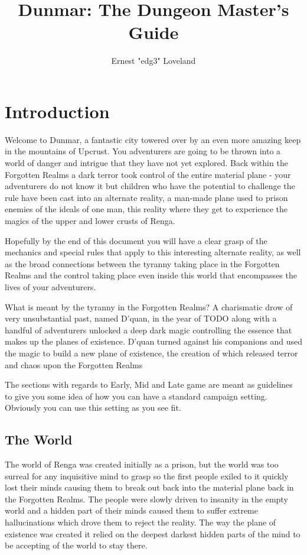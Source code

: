 \documentclass[10pt,twoside,twocolumn]{article}
\title{Dunmar: The Dungeon Master's Guide}
\author{Ernest "edg3" Loveland}
\begin{document}
\selectfont %

\maketitle
\tableofcontents

\section{Introduction}

Welcome to Dunmar, a fantastic city towered over by an even more amazing keep in the mountains of Upcrust. You adventurers are going to be thrown into a world of danger and intrigue that they have not yet explored. Back within the Forgotten Realms a dark terror took control of the entire material plane - your adventurers do not know it but children who have the potential to challenge the rule have been cast into an alternate reality, a man-made plane used to prison enemies of the ideals of one man, this reality where they get to experience the magics of the upper and lower crusts of Renga.

Hopefully by the end of this document you will have a clear grasp of the mechanics and special rules that apply to this interesting alternate reality, as well as the broad connections between the tyranny taking place in the Forgotten Realms and the control taking place even inside this world that encompasses the lives of your adventurers.

\begin{paperbox}{What is meant by the tyranny in the Forgotten Realms?}
A charismatic drow of very unsubstantial past, named D'quan, in the year of TODO along with a handful of adventurers unlocked a deep dark magic controlling the essence that makes up the planes of existence. D'quan turned against his companions and used the magic to build a new plane of existence, the creation of which released terror and chaos upon the Forgotten Realms
\end{paperbox}

The sections with regards to Early, Mid and Late game are meant as guidelines to give you some idea of how you can have a standard campaign setting. Obviously you can use this setting as you see fit.

\subsection{The World}
The world of Renga was created initially as a prison, but the world was too surreal for any inquisitive mind to grasp so the first people exiled to it quickly lost their minds causing them to break out back into the material plane back in the Forgotten Realms. The people were slowly driven to insanity in the empty world and a hidden part of their minds caused them to suffer extreme hallucinations which drove them to reject the reality. The way the plane of existence was created it relied on the deepest darkest hidden parts of the mind to be accepting of the world to stay there.
\end{document}
